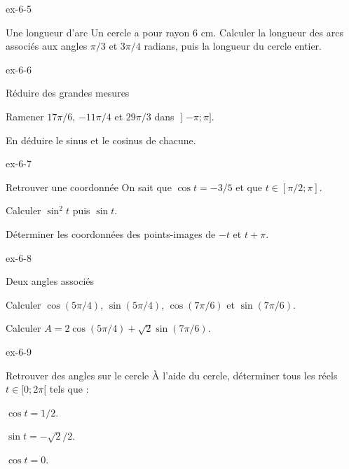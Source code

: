 \begin{blocLivre}{ex-6-5}
\begin{exercice}[1]{Une longueur d'arc}
Un cercle a pour rayon 6 cm. Calculer la longueur des arcs associés aux angles $\pi/3$ et $3\pi/4$ radians, puis la longueur du cercle entier.
\label{figlivre-r06-05-arcs-ex}

\end{exercice}
\end{blocLivre}
\clearpage
{}
\begin{blocLivre}{ex-6-6}
\begin{exercice}[2]{Réduire des grandes mesures}
\begin{questions}
\item Ramener $17\pi/6$, $-11\pi/4$ et $29\pi/3$ dans $\mathopen{]}-\pi;\pi]$.
\item En déduire le sinus et le cosinus de chacune.
\end{questions}
\end{exercice}
\end{blocLivre}
\begin{blocLivre}{ex-6-7}
\begin{exercice}[2]{Retrouver une coordonnée}
On sait que $\cos t=-3/5$ et que $t\in[\pi/2;\pi]$.\begin{questions}
\item Calculer $\sin^2t$ puis $\sin t$.
\item Déterminer les coordonnées des points-images de $-t$ et $t+\pi$.
\end{questions}
\label{figlivre-r06-07-coordonnee-ex}

\end{exercice}
\end{blocLivre}
\begin{blocLivre}{ex-6-8}
\begin{exercice}[2]{Deux angles associés}
\begin{questions}
\item Calculer $\cos(5\pi/4)$, $\sin(5\pi/4)$, $\cos(7\pi/6)$ et $\sin(7\pi/6)$.
\item Calculer $A=2\cos(5\pi/4)+\sqrt2\sin(7\pi/6)$.
\end{questions}
\end{exercice}
\end{blocLivre}
\begin{blocLivre}{ex-6-9}
\begin{exercice}[2]{Retrouver des angles sur le cercle}
À l’aide du cercle, déterminer tous les réels $t\in[0;2\pi[$ tels que :\begin{questions}
\item $\cos t=1/2$.
\item $\sin t=-\sqrt2/2$.
\item $\cos t=0$.
\end{questions}

\label{figgeo-06-09-ex}
\end{exercice}
\end{blocLivre}
